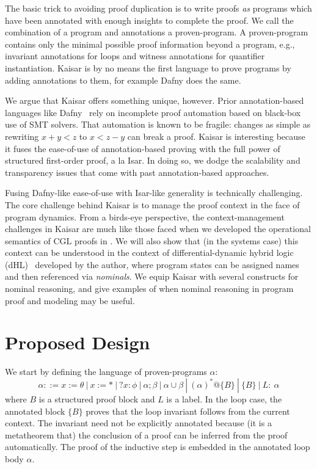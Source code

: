 \documentclass[12pt]{cmuthesis}
\theoremstyle{definition}
\theoremstyle{remark}
\newcommand{\rref}[2][]{\prettyref{#2}}
\newcommand{\dHL}{\textsf{dHL}\xspace}
\newcommand{\CGL}{\textsf{CGL}\xspace}
\begin{document}
The basic trick to avoiding proof duplication is to write proofs \emph{as} programs which have been annotated with enough insights to complete the proof.
We call the combination of a program and annotations a proven-program.
A proven-program contains only the minimal possible proof information beyond a program, e.g., invariant annotations for loops and witness annotations for quantifier instantiation.
Kaisar is by no means the first language to prove programs by adding annotations to them, for example Dafny does the same.

We argue that Kaisar offers something unique, however.
Prior annotation-based languages like Dafny~\cite{DBLP:conf/lpar/Leino10} rely on incomplete proof automation based on black-box use of SMT solvers.
That automation is known to be fragile: changes as simple as rewriting $x + y < z$ to $x < z - y$ can break a proof.
Kaisar is interesting because it fuses the ease-of-use of annotation-based proving with the full power of structured first-order proof, a la Isar.
In doing so, we dodge the scalability and transparency issues that come with past annotation-based approaches.

Fusing Dafny-like ease-of-use with Isar-like generality is technically challenging.
The core challenge behind Kaisar is to manage the proof context in the face of program dynamics.
From a birds-eye perspective, the context-management challenges in Kaisar are much like those faced when we developed the operational semantics of \CGL proofs in \rref{ch:cgl}.
We will also show that (in the systems case) this context can be understood in the context of differential-dynamic hybrid logic (\dHL)~\cite{DBLP:conf/lics/BohrerP18} developed by the author, where program states can be assigned names and then referenced via \emph{nominals}.
We equip Kaisar with several constructs for nominal reasoning, and give examples of when nominal reasoning in program proof and modeling may be useful.


\section{Proposed Design}
We start by defining the language of proven-programs $\alpha$:
\[\alpha ::= x{:=}\theta\ |\ x{:=}*\ |\ ?x:\phi\ |\ \alpha;\beta\ |\ \alpha\cup\beta\ |\ (\alpha)^*@\{B\}\ |\ \{B\}\ |\ L{:}\ \alpha\]
where $B$ is a structured proof block and $L$ is a label.
In the loop case, the annotated block $\{B\}$ proves that the loop invariant follows from the current context.
The invariant need not be explicitly annotated because (it is a metatheorem that) the conclusion of a proof can be inferred from the proof automatically.
The proof of the inductive step is embedded in the annotated loop body $\alpha$.
\end{document}
